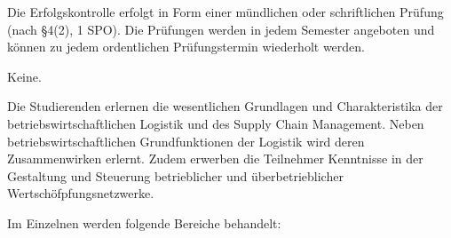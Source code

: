 \begin{course}

\setdoclanguagegerman
{}



\coursehead


\label{cour_8227.dp_997}


\begin{styleenv}
\begin{assessment}
Die Erfolgskontrolle erfolgt in Form einer mündlichen oder schriftlichen Prüfung (nach §4(2), 1 SPO). Die Prüfungen werden in jedem Semester angeboten und können zu jedem ordentlichen Prüfungstermin wiederholt werden.


\end{assessment}

\begin{conditions}Keine.\end{conditions}


\end{styleenv}

\begin{learningoutcomes}
Die Studierenden erlernen die wesentlichen Grundlagen und Charakteristika der betriebswirtschaftlichen Logistik und des Supply Chain Management. Neben betriebswirtschaftlichen Grundfunktionen der Logistik wird deren Zusammenwirken erlernt. Zudem erwerben die Teilnehmer Kenntnisse in der Gestaltung und Steuerung betrieblicher und überbetrieblicher Wertschöfpfungsnetzwerke.


\end{learningoutcomes}

\begin{content}
Im Einzelnen werden folgende Bereiche behandelt:


\end{content}
\end{course}
